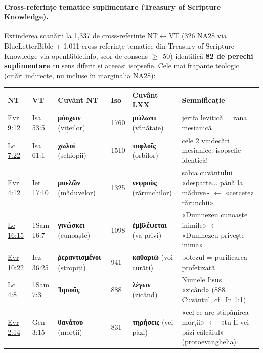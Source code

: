 \documentclass[12pt,a4paper,twoside,openany]{book}
\begin{document}
\paragraph*{Cross-referințe tematice suplimentare (Treasury of Scripture Knowledge).} Extinderea scanării la 1{,}337 de cross-referințe NT$\leftrightarrow$VT (326 NA28 via BlueLetterBible + 1{,}011 cross-referințe tematice din Treasury of Scripture Knowledge via openBible.info, scor de consens $\geq$~50) identifică \textbf{82 de perechi suplimentare} cu sens diferit și aceeași isopsefie. Cele mai frapante teologic (citări indirecte, nu incluse în marginalia NA28):

\begin{center}
\footnotesize
\begin{tabularx}{\textwidth}{L{1.5cm}L{1.5cm}L{2.6cm}C{0.7cm}L{2.6cm}X}
\toprule
{}
\textbf{NT} & \textbf{VT} & \textbf{Cuvânt NT} & \textbf{Iso} & \textbf{Cuvânt LXX} & \textbf{Semnificație} \\
\midrule
\href{https://bibliaortodoxa.ro/carte.php?id=65\&cap=9\#12}{Evr 9:12} & Isa 53:5 & \textbf{μόσχων} (vițeilor) & 1760 & \textbf{μώλωπι} (vânătaie) & jertfa levitică = rana mesianică \\
\href{https://bibliaortodoxa.ro/carte.php?id=48\&cap=7\#22}{Lc 7:22} & Isa 61:1 & \textbf{χωλοί} (șchiopii) & 1510 & \textbf{τυφλοῖς} (orbilor) & cele 2 vindecări mesianice: isopsefie identică! \\
\href{https://bibliaortodoxa.ro/carte.php?id=65\&cap=4\#12}{Evr 4:12} & Ier 17:10 & \textbf{μυελῶν} (măduvelor) & 1325 & \textbf{νεφροὺς} (rărunchilor) & sabia cuvântului «desparte... până la măduve» $\leftarrow$ «cercetez rărunchii» \\
\href{https://bibliaortodoxa.ro/carte.php?id=48\&cap=16\#15}{Lc 16:15} & 1Sam 16:7 & \textbf{γινώσκει} (cunoaște) & 1098 & \textbf{ἐμβλέψεται} (va privi) & «Dumnezeu cunoaște inimile» $\leftarrow$ «Dumnezeu privește inima» \\
\href{https://bibliaortodoxa.ro/carte.php?id=65\&cap=10\#22}{Evr 10:22} & Iez 36:25 & \textbf{ῥεραντισμένοι} (stropiți) & 941 & \textbf{καθαριῶ} (voi curăți) & botezul = purificarea profetizată \\
\href{https://bibliaortodoxa.ro/carte.php?id=48\&cap=4\#8}{Lc 4:8} & 1Sam 7:3 & \textbf{Ἰησοῦς} & 888 & \textbf{λέγων} (zicând) & Numele Iisus = «zicând» (888 = Cuvântul, cf.~In 1:1) \\
\href{https://bibliaortodoxa.ro/carte.php?id=65\&cap=2\#14}{Evr 2:14} & Gen 3:15 & \textbf{θανάτου} (morții) & 831 & \textbf{τηρήσεις} (vei păzi) & «cel ce are stăpânirea morții» $\leftarrow$ «tu Îi vei păzi călcâiul» (protoevanghelia) \\

\end{tabularx}
\end{center}
\end{document}
